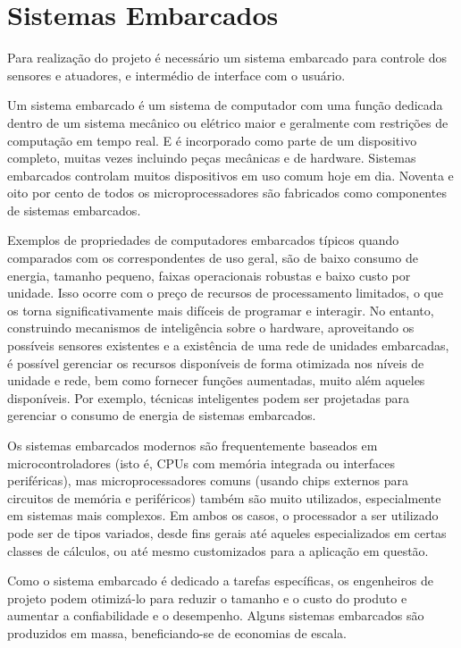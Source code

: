 \section{Sistemas Embarcados}

Para realização do projeto é necessário um sistema embarcado para controle dos sensores e atuadores, e intermédio de interface com o usuário.

Um sistema embarcado é um sistema de computador com uma função dedicada dentro de um sistema mecânico ou elétrico maior e geralmente com restrições de computação em tempo real. E é incorporado como parte de um dispositivo completo, muitas vezes incluindo peças mecânicas e de hardware. Sistemas embarcados controlam muitos dispositivos em uso comum hoje em dia. Noventa e oito por cento de todos os microprocessadores são fabricados como componentes de sistemas embarcados\cite{heath2003}.

Exemplos de propriedades de computadores embarcados típicos quando comparados com os correspondentes de uso geral, são de baixo consumo de energia, tamanho pequeno, faixas operacionais robustas e baixo custo por unidade. Isso ocorre com o preço de recursos de processamento limitados, o que os torna significativamente mais difíceis de programar e interagir. No entanto, construindo mecanismos de inteligência sobre o hardware, aproveitando os possíveis sensores existentes e a existência de uma rede de unidades embarcadas, é possível gerenciar os recursos disponíveis de forma otimizada nos níveis de unidade e rede, bem como fornecer funções aumentadas, muito além aqueles disponíveis. Por exemplo, técnicas inteligentes podem ser projetadas para gerenciar o consumo de energia de sistemas embarcados\cite{heath2003}\cite{michael2007}.

Os sistemas embarcados modernos são frequentemente baseados em microcontroladores (isto é, CPUs com memória integrada ou interfaces periféricas), mas microprocessadores comuns (usando chips externos para circuitos de memória e periféricos) também são muito utilizados, especialmente em sistemas mais complexos. Em ambos os casos, o processador a ser utilizado  pode ser de tipos variados, desde fins gerais até aqueles especializados em certas classes de cálculos, ou até mesmo customizados para a aplicação em questão\cite{heath2003}\cite{michael2007}.

Como o sistema embarcado é dedicado a tarefas específicas, os engenheiros de projeto podem otimizá-lo para reduzir o tamanho e o custo do produto e aumentar a confiabilidade e o desempenho. Alguns sistemas embarcados são produzidos em massa, beneficiando-se de economias de escala\cite{michael2007}.

